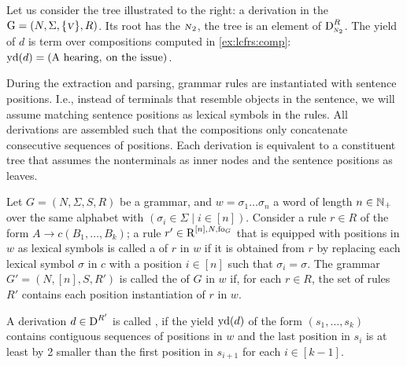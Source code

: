 \documentclass[../../document.tex]{subfiles}
\begin{document}
    \begin{wrapfigure}[6]{r}{0pt}
    \end{wrapfigure}
    \label{ex:lcfrs:deriv}
    Let us consider the tree illustrated to the right: a derivation in the  \(\mathrm{G} = (N, \Sigma, \{\textsc{\textsl{v}}\}, R)\).
    Its root has the  \(\textsc{\textsl{n}}_2\), the tree is an element of \(\operatorname{D}^R_{\textsc{\textsl{n}}_2}\).
    The yield of \(d\) is term over compositions computed in \cref{ex:lcfrs:comp}: \(\operatorname{yd}(d) = (\text{A hearing}, \: \text{on the issue})\).
    \exampleqed

    \vspace{\baselineskip}

    During the extraction and parsing, grammar rules are instantiated with sentence positions. \citep[Definition 6.8]{Kal10}
    I.e., instead of terminals that resemble objects in the sentence, we will assume matching sentence positions as lexical symbols in the rules.
    All derivations are assembled such that the compositions only concatenate consecutive sequences of positions.
    Each derivation is equivalent to a constituent tree that assumes the  nonterminals as inner nodes and the sentence positions as leaves.

    \begin{definition}
        Let \(G = (N, \varSigma, S, R)\) be a grammar, and \(w = \sigma_1 \ldots \sigma_n\) a word of length \(n \in \mathbb{N}_+\) over the same alphabet with \((\sigma_i \in \varSigma \mid i \in [n])\).
        Consider a rule \(r\in R\) of the form \(A \to c (B_1, \ldots, B_k)\); a rule \(r' \in \operatorname{R}^{[n],N,\operatorname{fo}_G}\) that is equipped with positions in \(w\) as lexical symbols is called a  of \(r\) in \(w\) if it is obtained from \(r\) by replacing each lexical symbol \(\sigma\) in \(c\) with a position \(i \in [n]\) such that \(\sigma_i = \sigma\).
        The grammar \(G' = (N, [n], S, R')\) is called the  of \(G\) in \(w\) if, for each \(r \in R\), the set of rules \(R'\) contains each position instantiation of \(r\) in \(w\).
        
        A derivation \(d \in \operatorname{D}^{R'}\) is called , if the yield \(\operatorname{yd}(d)\) of the form \((s_1, \ldots, s_k)\) contains contiguous sequences of positions in \(w\) and the last position in \(s_i\) is at least by 2 smaller than the first position in \(s_{i+1}\) for each \(i \in [k-1]\).
    \end{definition}
\end{document}
